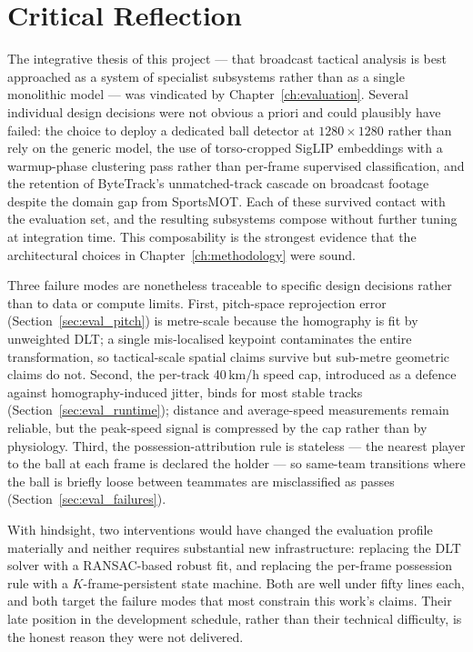 \section{Critical Reflection}
\label{sec:critical_reflection}

The integrative thesis of this project --- that broadcast tactical analysis is best
approached as a system of specialist subsystems rather than as a single monolithic
model --- was vindicated by Chapter~\ref{ch:evaluation}. Several individual design
decisions were not obvious a priori and could plausibly have failed: the choice to
deploy a dedicated ball detector at $1280 \times 1280$ rather than rely on the generic
model, the use of torso-cropped SigLIP embeddings with a warmup-phase clustering pass
rather than per-frame supervised classification, and the retention of ByteTrack's
unmatched-track cascade on broadcast footage despite the domain gap from SportsMOT.
Each of these survived contact with the evaluation set, and the resulting subsystems
compose without further tuning at integration time. This composability is the strongest
evidence that the architectural choices in Chapter~\ref{ch:methodology} were sound.

Three failure modes are nonetheless traceable to specific design decisions rather
than to data or compute limits. First, pitch-space reprojection error
(Section~\ref{sec:eval_pitch}) is metre-scale because the homography is fit by
unweighted DLT; a single mis-localised keypoint contaminates the entire
transformation, so tactical-scale spatial claims survive but sub-metre geometric
claims do not. Second, the per-track 40\,km/h speed cap,
introduced as a defence against homography-induced jitter, binds for most stable
tracks (Section~\ref{sec:eval_runtime}); distance and average-speed measurements
remain reliable, but the peak-speed signal is compressed by the cap rather than
by physiology. Third, the possession-attribution rule is stateless --- the
nearest player to the ball at each frame is declared the holder --- so same-team
transitions where the ball is briefly loose between teammates are misclassified
as passes (Section~\ref{sec:eval_failures}).

With hindsight, two interventions would have changed the evaluation profile
materially and neither requires substantial new infrastructure: replacing the DLT
solver with a RANSAC-based robust fit, and replacing the per-frame possession
rule with a $K$-frame-persistent state machine. Both are well under fifty lines
each, and both target the failure modes that most constrain this work's claims.
Their late position in the development schedule, rather than their technical
difficulty, is the honest reason they were not delivered.

